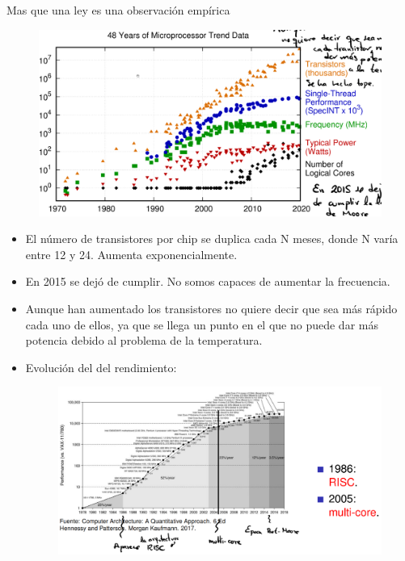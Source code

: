 \documentclass[12pt, twoside, openright]{report} %
\begin{document}
  Mas que una ley es una observación empírica
  \begin{figure}[H]
    {\includegraphics[scale=.2]{Untitled.png}}
  \end{figure}
  \begin{itemize}
  \item
    El número de transistores por chip se duplica cada N meses, donde N
    varía entre 12 y 24. Aumenta exponencialmente.
  \item
    En 2015 se dejó de cumplir. No somos capaces de aumentar la
    frecuencia.
  \item
    Aunque han aumentado los transistores no quiere decir que sea más
    rápido cada uno de ellos, ya que se llega un punto en el que no
    puede dar más potencia debido al problema de la temperatura.
  \item
    Evolución del del rendimiento:
    \begin{figure}[H]
      {\includegraphics[scale=.35]{Untitled 1.png}}
    \end{figure}
  \end{itemize}
\end{document}
